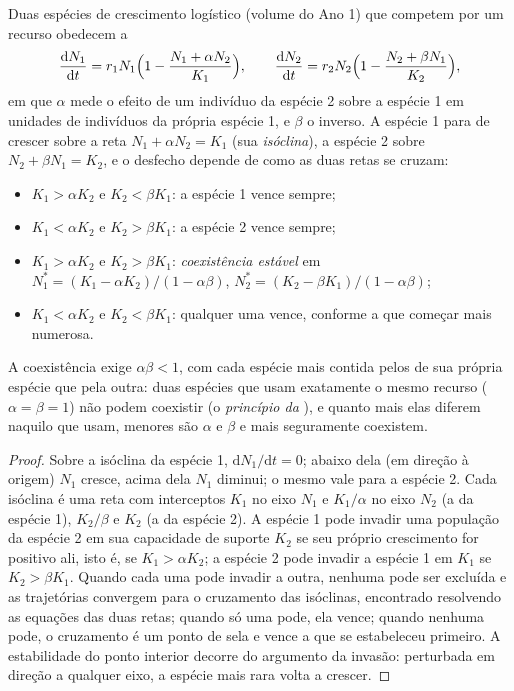 \begin{theorem}\label{thm:b2:speciation:lv}
Duas espécies de crescimento logístico (volume do Ano 1) que competem
por um recurso obedecem a
\[
\frac{\mathrm{d}N_1}{\mathrm{d}t} = r_1 N_1\Bigl(1 - \frac{N_1 + \alpha N_2}{K_1}\Bigr), \qquad
\frac{\mathrm{d}N_2}{\mathrm{d}t} = r_2 N_2\Bigl(1 - \frac{N_2 + \beta N_1}{K_2}\Bigr),
\]
em que $\alpha$ mede o efeito de um indivíduo da espécie 2 sobre a
espécie 1 em unidades de indivíduos da própria espécie 1, e $\beta$ o
inverso. A espécie 1 para de crescer sobre a reta $N_1 + \alpha N_2 =
K_1$ (sua \emph{isóclina}), a espécie 2 sobre $N_2 + \beta N_1 = K_2$, e
o desfecho depende de como as duas retas se cruzam:
\begin{itemize}
  \item $K_1 > \alpha K_2$ e $K_2 < \beta K_1$: a espécie 1 vence
        sempre;
  \item $K_1 < \alpha K_2$ e $K_2 > \beta K_1$: a espécie 2 vence
        sempre;
  \item $K_1 > \alpha K_2$ e $K_2 > \beta K_1$: \emph{coexistência
        estável} em $N_1^{*} = (K_1 - \alpha K_2)/(1 - \alpha\beta)$,
        $N_2^{*} = (K_2 - \beta K_1)/(1 - \alpha\beta)$;
  \item $K_1 < \alpha K_2$ e $K_2 < \beta K_1$: qualquer uma vence,
        conforme a que começar mais numerosa.
\end{itemize}
A coexistência exige $\alpha\beta < 1$, com cada espécie mais contida
pelos de sua própria espécie que pela outra: duas espécies que usam
exatamente o mesmo recurso ($\alpha = \beta = 1$) não podem coexistir
(o \emph{princípio da }), e quanto mais elas
diferem naquilo que usam, menores são $\alpha$ e $\beta$ e mais
seguramente coexistem.
\end{theorem}
\begin{proof}
Sobre a isóclina da espécie 1, $\mathrm{d}N_1/\mathrm{d}t = 0$; abaixo
dela (em direção à origem) $N_1$ cresce, acima dela $N_1$ diminui; o
mesmo vale para a espécie 2. Cada isóclina é uma reta com interceptos
$K_1$ no eixo $N_1$ e $K_1/\alpha$ no eixo $N_2$ (a da espécie 1),
$K_2/\beta$ e $K_2$ (a da espécie 2). A espécie 1 pode invadir uma
população da espécie 2 em sua capacidade de suporte $K_2$ se seu próprio
crescimento for positivo ali, isto é, se $K_1 > \alpha K_2$; a espécie 2
pode invadir a espécie 1 em $K_1$ se $K_2 > \beta K_1$. Quando cada uma
pode invadir a outra, nenhuma pode ser excluída e as trajetórias
convergem para o cruzamento das isóclinas, encontrado resolvendo as
equações das duas retas; quando só uma pode, ela vence; quando nenhuma
pode, o cruzamento é um ponto de sela e vence a que se estabeleceu
primeiro. A estabilidade do ponto interior decorre do argumento da
invasão: perturbada em direção a qualquer eixo, a espécie mais rara
volta a crescer.
\end{proof}

